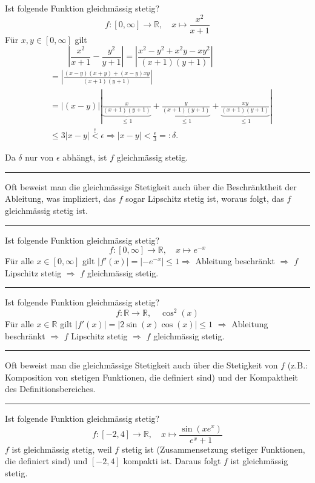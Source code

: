 \documentclass[a4paper,landscape,8pt]{extarticle}
\newcommand{\R}{\mathbb{R}}
\newcommand{\abs}[1]{\left\lvert #1 \right\rvert}
\newcommand{\sep}{\vspace{5pt}\noindent\hrule\vspace{5pt}}
\begin{document}
\begin{multicols*}{4}
\begin{warmup}
\Bsp Ist folgende Funktion gleichmässig stetig?
\[
f\colon [0,\infty]\to\R, \quad x \mapsto \frac{x^2}{x+1}
\]
Für $x,y\in[0,\infty]$ gilt
\[
\abs{\frac{x^2}{x+1}-\frac{y^2}{y+1}}=\abs{\frac{x^2-y^2+x^2y-xy^2}{(x+1)(y+1)}}
\qquad\qquad
\]
\begin{align*}
&=\abs{\frac{(x-y)(x+y)+(x-y)xy}{(x+1)(y+1)}}\\
&=\abs{(x-y)}
\abs{
\underbrace{\tfrac{x}{(x+1)(y+1)}}_{\leq1}+
\underbrace{\tfrac{y}{(x+1)(y+1)}}_{\leq 1}+
\underbrace{\tfrac{xy}{(x+1)(y+1)}}_{\leq 1}
}
\\
& \leq 3 \abs{x-y} \stackrel{!}{<}\epsilon \Longrightarrow \abs{x-y}
<\frac{\epsilon}{3}=:\delta.
\end{align*}

Da $\delta$ nur von $\epsilon$ abhängt, ist $f$ gleichmässig stetig.

\sep
\end{warmup}

\Vorgehen Oft beweist man die gleichmässige Stetigkeit auch über die
Beschränktheit der Ableitung, was impliziert, das $f$ sogar Lipschitz stetig
ist, woraus folgt, das $f$ gleichmässig stetig ist.


\begin{warmup}
\sep

\Bsp Ist folgende Funktion gleichmässig stetig?
\[
f\colon[0,\infty]\to\R, \quad x \mapsto e^{-x}
\]
Für alle $x\in[0,\infty]$ gilt $\abs{f'(x)}=\abs{-e^{-x}} \leq 1
\Longrightarrow$ Ableitung beschränkt $\Longrightarrow$ $f$ Lipschitz stetig
$\Longrightarrow$ $f$ gleichmässig stetig.

\sep

\Bsp Ist folgende Funktion gleichmässig stetig?
\[
f\colon\R\to\R, \quad \cos^2(x)
\]
Für alle $x\in\R$ gilt $\abs{f'(x)}=\abs{2\sin(x)\cos(x)}\leq 1$
$\Longrightarrow$ Ableitung beschränkt $\Longrightarrow$ $f$ Lipschitz stetig
$\Longrightarrow$ $f$ gleichmässig stetig.

\sep

\end{warmup}

\Vorgehen Oft beweist man die gleichmässige Stetigkeit auch über die Stetigkeit
von $f$ (z.B.: Komposition von stetigen Funktionen, die definiert sind) und der
Kompaktheit des Definitionsbereiches.

\begin{warmup}
\sep

\Bsp Ist folgende Funktion gleichmässig stetig?
\[
f\colon[-2,4]\to\R, \quad x\mapsto \frac{\sin(xe^x)}{e^x+1}
\]
$f$ ist gleichmässig stetig, weil $f$ stetig ist (Zusammensetzung stetiger
Funktionen, die definiert sind) und $[-2,4]$ kompakti ist. Daraus folgt $f$ ist
gleichmässig stetig.


\end{warmup}
\end{multicols*}
\end{document}
